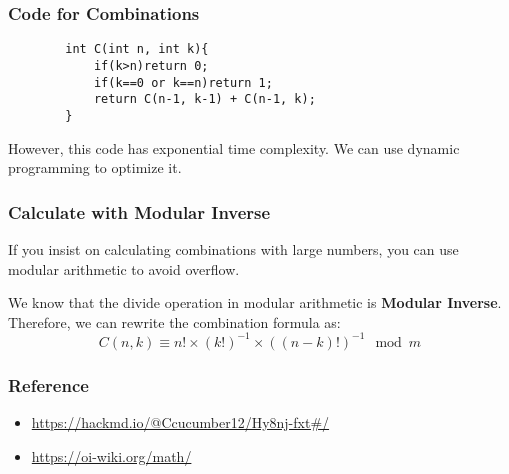 \documentclass[xcolor=dvipsnames]{beamer}
\begin{document}
    \begin{frame}[fragile]
        \frametitle{Code for Combinations}
        \begin{verbatim}
        int C(int n, int k){
            if(k>n)return 0;
            if(k==0 or k==n)return 1;
            return C(n-1, k-1) + C(n-1, k);
        }
        \end{verbatim}
        However, this code has exponential time complexity. We can use dynamic programming to optimize it.
    \end{frame}
    \begin{frame}
        \frametitle{Calculate with Modular Inverse}
        If you insist on calculating combinations with large numbers, you can use modular arithmetic to avoid overflow.

        We know that the divide operation in modular arithmetic is \textbf{Modular Inverse}. Therefore, we can rewrite the combination formula as:
        $$
        C(n, k) \equiv n! \times (k!)^{-1} \times ((n-k)!)^{-1} \mod m
        $$
    \end{frame}

    \begin{frame}
        \frametitle{Reference}
        \begin{itemize}
            \item \url{https://hackmd.io/@Ccucumber12/Hy8nj-fxt\#/}
            \item \url{https://oi-wiki.org/math/}
        \end{itemize}
    \end{frame}
\end{document}

